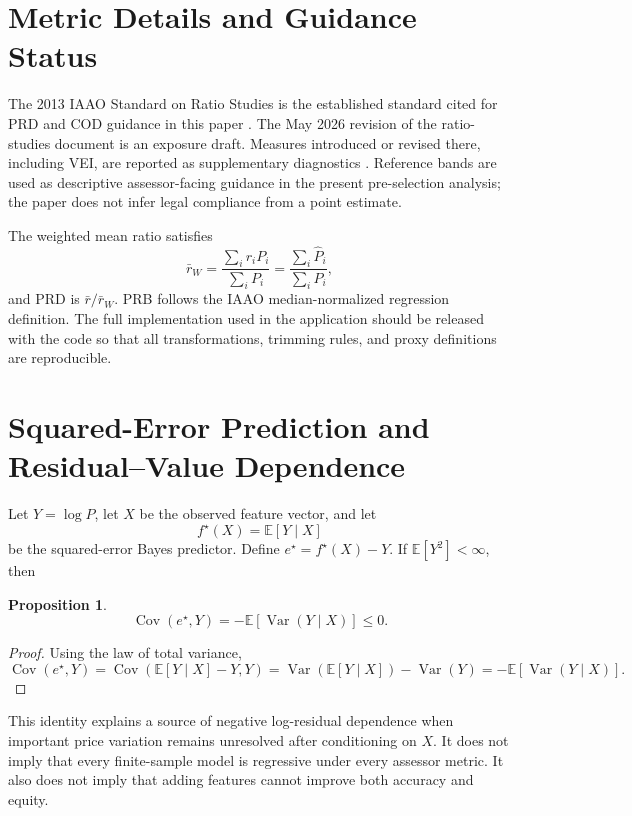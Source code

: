 \documentclass[10pt]{article}
\newtheorem{proposition}{Proposition}
\theoremstyle{definition}
\newcommand{\E}{\mathbb{E}}
\newcommand{\Cov}{\operatorname{Cov}}
\newcommand{\Var}{\operatorname{Var}}
\newcommand{\1}{\mathbf{1}}
\newcommand{\advisorchange}[1]{{\color{blue}#1}}
\begin{document}
\printbibliography


\appendix

\section{Metric Details and Guidance Status}
\label{app:metrics}

The 2013 IAAO Standard on Ratio Studies is the established standard cited for PRD and COD guidance in this paper \cite{IAAO2013Ratio}. The May 2026 revision of the ratio-studies document is an exposure draft. Measures introduced or revised there, including VEI, are reported as supplementary diagnostics \cite{IAAO2026ExposureRatio}. Reference bands are used as descriptive assessor-facing guidance in the present pre-selection analysis; the paper does not infer legal compliance from a point estimate.

The weighted mean ratio satisfies
\[
\bar r_W
=
\frac{\sum_i r_iP_i}{\sum_iP_i}
=
\frac{\sum_i\widehat P_i}{\sum_iP_i},
\]
and PRD is $\bar r/\bar r_W$. PRB follows the IAAO median-normalized regression definition. The full implementation \advisorchange{used in the application should be released} with the code so that all transformations, trimming rules, and proxy definitions are reproducible.

\section{Squared-Error Prediction and Residual--Value Dependence}
\label{app:population_identity}

Let $Y=\log P$, let $X$ be the observed feature vector, and let
\[
f^\star(X)=\E[Y\mid X]
\]
be the squared-error Bayes predictor. Define $e^\star=f^\star(X)-Y$. If $\E[Y^2]<\infty$, then
\begin{proposition}
\label{prop:bayes_covariance}
\[
\Cov(e^\star,Y)
=
-\E[\Var(Y\mid X)]
\le 0.
\]
\end{proposition}
\begin{proof}
Using the law of total variance,
\[
\Cov(e^\star,Y)
=
\Cov(\E[Y\mid X]-Y,Y)
=
\Var(\E[Y\mid X])-\Var(Y)
=
-\E[\Var(Y\mid X)].
\]
\end{proof}

This identity explains a source of negative log-residual dependence when important price variation remains unresolved after conditioning on $X$. It does not imply that every finite-sample model is regressive under every assessor metric. It also does not imply that adding features cannot improve both accuracy and equity.
\end{document}
